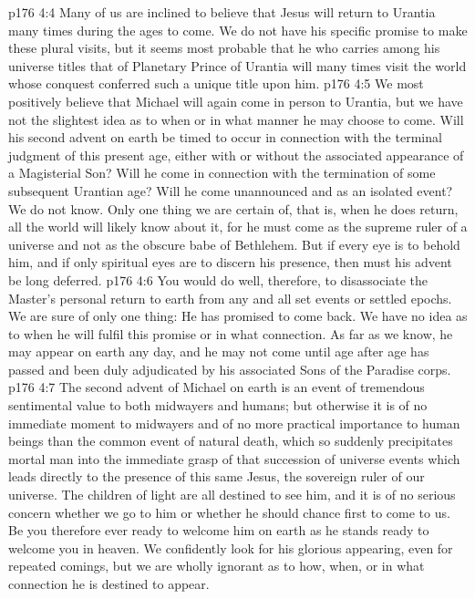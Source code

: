 \vs p176 4:4 Many of us are inclined to believe that Jesus will return to Urantia many times during the ages to come. We do not have his specific promise to make these plural visits, but it seems most probable that he who carries among his universe titles that of Planetary Prince of Urantia will many times visit the world whose conquest conferred such a unique title upon him.
\vs p176 4:5 We most positively believe that Michael will again come in person to Urantia, but we have not the slightest idea as to when or in what manner he may choose to come. Will his second advent on earth be timed to occur in connection with the terminal judgment of this present age, either with or without the associated appearance of a Magisterial Son? Will he come in connection with the termination of some subsequent Urantian age? Will he come unannounced and as an isolated event? We do not know. Only one thing we are certain of, that is, when he does return, all the world will likely know about it, for he must come as the supreme ruler of a universe and not as the obscure babe of Bethlehem. But if every eye is to behold him, and if only spiritual eyes are to discern his presence, then must his advent be long deferred.
\vs p176 4:6 You would do well, therefore, to disassociate the Master’s personal return to earth from any and all set events or settled epochs. We are sure of only one thing: He has promised to come back. We have no idea as to when he will fulfil this promise or in what connection. As far as we know, he may appear on earth any day, and he may not come until age after age has passed and been duly adjudicated by his associated Sons of the Paradise corps.
\vs p176 4:7 The second advent of Michael on earth is an event of tremendous sentimental value to both midwayers and humans; but otherwise it is of no immediate moment to midwayers and of no more practical importance to human beings than the common event of natural death, which so suddenly precipitates mortal man into the immediate grasp of that succession of universe events which leads directly to the presence of this same Jesus, the sovereign ruler of our universe. The children of light are all destined to see him, and it is of no serious concern whether we go to him or whether he should chance first to come to us. Be you therefore ever ready to welcome him on earth as he stands ready to welcome you in heaven. We confidently look for his glorious appearing, even for repeated comings, but we are wholly ignorant as to how, when, or in what connection he is destined to appear.
\quizlink
